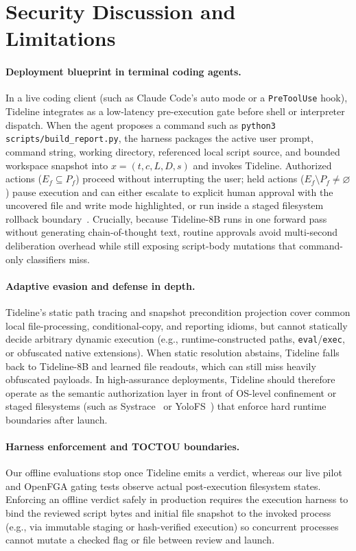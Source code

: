 \documentclass[sigconf,anonymous,nonacm]{acmart}
\begin{document}
\section{Security Discussion and Limitations}\label{sec:discussion}

\paragraph{Deployment blueprint in terminal coding agents.}
In a live coding client (such as Claude Code's auto mode or a \texttt{PreToolUse} hook), Tideline integrates as a low-latency pre-execution gate before shell or interpreter dispatch. When the agent proposes a command such as \texttt{python3 scripts/build\_report.py}, the harness packages the active user prompt, command string, working directory, referenced local script source, and bounded workspace snapshot into $x=(t,c,L,D,s)$ and invokes Tideline. Authorized actions ($E_f \subseteq P_f$) proceed without interrupting the user; held actions ($E_f \setminus P_f \neq \varnothing$) pause execution and can either escalate to explicit human approval with the uncovered file and write mode highlighted, or run inside a staged filesystem rollback boundary~\cite{yolofs}. Crucially, because Tideline-8B runs in one forward pass without generating chain-of-thought text, routine approvals avoid multi-second deliberation overhead while still exposing script-body mutations that command-only classifiers miss.

\paragraph{Adaptive evasion and defense in depth.}
Tideline's static path tracing and snapshot precondition projection cover common local file-processing, conditional-copy, and reporting idioms, but cannot statically decide arbitrary dynamic execution (e.g., runtime-constructed paths, \texttt{eval}/\texttt{exec}, or obfuscated native extensions). When static resolution abstains, Tideline falls back to Tideline-8B and learned file readouts, which can still miss heavily obfuscated payloads. In high-assurance deployments, Tideline should therefore operate as the semantic authorization layer in front of OS-level confinement or staged filesystems (such as Systrace~\cite{systrace} or YoloFS~\cite{yolofs}) that enforce hard runtime boundaries after launch.

\paragraph{Harness enforcement and TOCTOU boundaries.}
Our offline evaluations stop once Tideline emits a verdict, whereas our live pilot and OpenFGA gating tests observe actual post-execution filesystem states. Enforcing an offline verdict safely in production requires the execution harness to bind the reviewed script bytes and initial file snapshot to the invoked process (e.g., via immutable staging or hash-verified execution) so concurrent processes cannot mutate a checked flag or file between review and launch.
\end{document}
